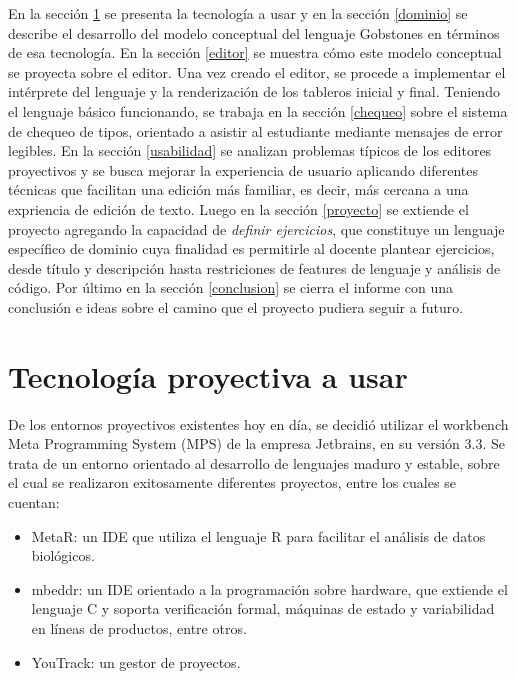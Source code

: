 En la sección \ref{tecnologias} se presenta la tecnología a usar y en la sección \ref{dominio} se describe el desarrollo del modelo conceptual del lenguaje Gobstones en términos de esa tecnología. En la sección \ref{editor} se muestra cómo este modelo conceptual se proyecta sobre el editor. Una vez creado el editor, se procede a implementar el intérprete del lenguaje y la renderización de los tableros inicial y final. Teniendo el lenguaje básico funcionando, se trabaja en la sección \ref{chequeo} sobre el sistema de chequeo de tipos, orientado a asistir al estudiante mediante mensajes de error legibles. En la sección \ref{usabilidad} se analizan problemas típicos de los editores proyectivos y se busca mejorar la experiencia de usuario aplicando diferentes técnicas que facilitan una edición más familiar, es decir, más cercana a una expriencia de edición de texto. Luego en la sección \ref{proyecto} se extiende el proyecto agregando la capacidad de \textit{definir ejercicios}, que constituye un lenguaje específico de dominio cuya finalidad es permitirle al docente plantear ejercicios, desde título y descripción hasta restriciones de features de lenguaje y análisis de código. Por último en la sección \ref{conclusion} se cierra el informe con una conclusión e ideas sobre el camino que el proyecto pudiera seguir a futuro.

\section{Tecnología proyectiva a usar}\label{tecnologias}

De los entornos proyectivos existentes hoy en día, se decidió utilizar el workbench Meta Programming System (MPS)\cite{MPS} de la empresa Jetbrains, en su versión 3.3.
Se trata de un entorno orientado al desarrollo de lenguajes maduro y estable, sobre el cual se realizaron exitosamente diferentes proyectos, entre los cuales se cuentan:
\begin{itemize}
\item MetaR\cite{MetaR}: un IDE que utiliza el lenguaje R para facilitar el análisis de datos biológicos.
\item mbeddr\cite{mbeddr}: un IDE orientado a la programación sobre hardware, que extiende el lenguaje C y soporta verificación formal, máquinas de estado y variabilidad en líneas de productos, entre otros.
\item YouTrack\cite{YouTrack}: un gestor de proyectos.
\end{itemize}

